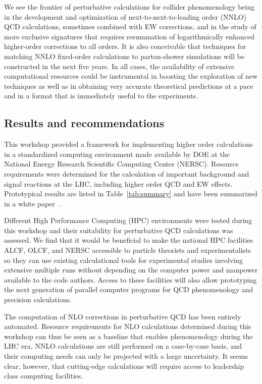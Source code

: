 We see the frontier of perturbative
calculations for collider phenomenology being in the
development and optimization of next-to-next-to-leading order (NNLO)
QCD calculations, sometimes combined with EW corrections, and in the
study of more exclusive signatures that requires resummation 
of logarithmically enhanced higher-order corrections to all orders.
It is also conceivable that techniques for matching NNLO fixed-order 
calculations to parton-shower simulations will be constructed in the 
next five years. In all cases, the availability 
of extensive computational resources could be instrumental
in boosting the exploration of new techniques as well as in
obtaining very accurate theoretical predictions at a pace and in a
format that is immediately useful to the experiments.

\subsection{Results and recommendations}

This workshop provided a framework for implementing higher order  
calculations in a standardized computing environment made available 
by DOE at the National Energy Research Scientific Computing Center
(NERSC).  Resource requirements were determined for the
calculation of important background and signal reactions at the
LHC, including higher order QCD and EW effects. Prototypical results 
are listed in Table~\ref{tab:summary} and have been summarized in a 
white paper~\cite{HPCWP}.

Different High Performance Computing (HPC) environments were tested
during this workshop and their suitability for perturbative QCD calculations 
was assessed. We find that it would be beneficial to make the national HPC 
facilities ALCF, OLCF, and NERSC accessible to particle theorists and
experimentalists so they can use existing
calculational tools for experimental studies involving extensive
multiple runs without depending on the computer power and manpower
available to the code authors. Access to these facilities will also
allow prototyping the next generation of parallel computer programs
for QCD phenomenology and precision calculations.

The computation of NLO corrections in perturbative QCD has been entirely
automated. Resource requirements for NLO calculations determined during 
this workshop can thus be seen as a baseline that enables phenomenology 
during the LHC era. NNLO calculations are still performed 
on a case-by-case basis, and their computing needs can only be 
projected with a large uncertainty. It seems clear, however, that cutting-edge 
calculations will require access to leadership class computing facilities.


